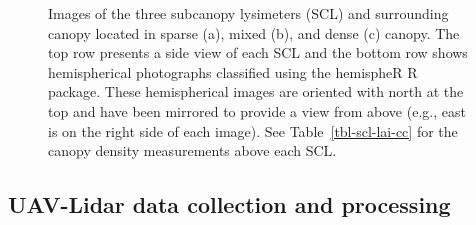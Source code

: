 \documentclass[
  letterpaper,
  DIV=11,
  numbers=noendperiod]{scrartcl}
\begin{document}
\begin{figure}[H]


\caption{\label{fig-scl-imgs}Images of the three subcanopy lysimeters
(SCL) and surrounding canopy located in sparse (a), mixed (b), and dense
(c) canopy. The top row presents a side view of each SCL and the bottom
row shows hemispherical photographs classified using the hemispheR R
package. These hemispherical images are oriented with north at the top
and have been mirrored to provide a view from above (e.g., east is on
the right side of each image). See Table~\ref{tbl-scl-lai-cc} for the
canopy density measurements above each SCL.}

\end{figure}%

\subsection{UAV-Lidar data collection and
processing}\label{uav-lidar-data-collection-and-processing}
\end{document}
